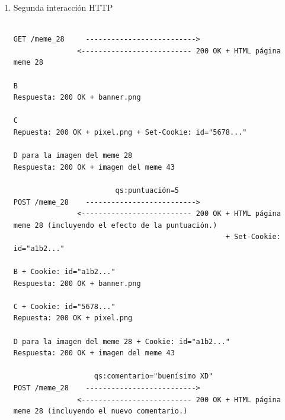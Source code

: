 \begin{enumerate}
\begin{verbatim}
B + cookie con id "abcd..."
Respuesta: 200 OK + banner.png

C + cookie con id "1234..."
Repuesta: 200 OK + pixel.png

10 x D + cookie con id "abcd..."
Respuesta: 200 OK + imagen del meme

                        qs:fichero=.....
                       cookie:id="..."
POST /          -------------------------->
               <-------------------------- 302 redirect

                       cookie: id="abcd..."
GET /meme_43     -------------------------->
               <-------------------------- 200 OK + HTML página meme 43

B + cookie con id "abcd..."
Respuesta: 200 OK + banner.png

C + cookie con id "1234..."
Repuesta: 200 OK + pixel.png

D para la imagen del meme 43 + cookie con id "abcd..."
Respuesta: 200 OK + imagen del meme 43

\end{verbatim}

\item Segunda interacción HTTP

\begin{verbatim}
                     
GET /meme_28     -------------------------->
               <-------------------------- 200 OK + HTML página meme 28

B
Respuesta: 200 OK + banner.png

C
Repuesta: 200 OK + pixel.png + Set-Cookie: id="5678..."

D para la imagen del meme 28
Respuesta: 200 OK + imagen del meme 43

                        qs:puntuación=5
POST /meme_28    -------------------------->
               <-------------------------- 200 OK + HTML página meme 28 (incluyendo el efecto de la puntuación.)
                                                  + Set-Cookie: id="a1b2..."
           
B + Cookie: id="a1b2..."
Respuesta: 200 OK + banner.png

C + Cookie: id="5678..."
Repuesta: 200 OK + pixel.png

D para la imagen del meme 28 + Cookie: id="a1b2..."
Respuesta: 200 OK + imagen del meme 43

                   qs:comentario="buenísimo XD"
POST /meme_28    -------------------------->
               <-------------------------- 200 OK + HTML página meme 28 (incluyendo el nuevo comentario.)


\end{verbatim}
\end{enumerate}
